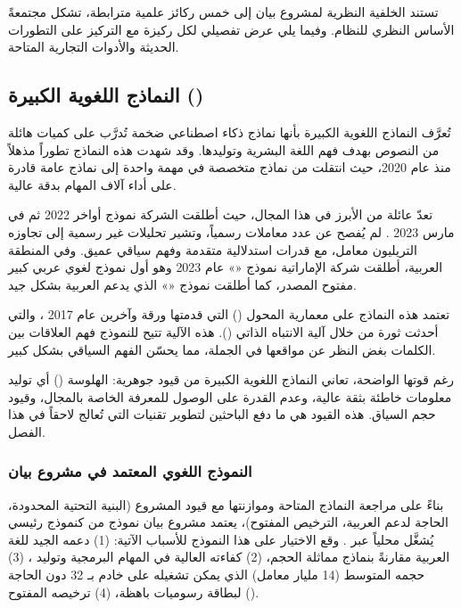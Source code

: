 تستند الخلفية النظرية لمشروع بيان إلى خمس ركائز علمية مترابطة، تشكل مجتمعةً
الأساس النظري للنظام. وفيما يلي عرض تفصيلي لكل ركيزة مع التركيز على التطورات
الحديثة والأدوات التجارية المتاحة.

\subsection{النماذج اللغوية الكبيرة ()}
\label{subsec:llms}

تُعرَّف النماذج اللغوية الكبيرة بأنها نماذج ذكاء اصطناعي ضخمة تُدرَّب على
كميات هائلة من النصوص بهدف فهم اللغة البشرية وتوليدها. وقد شهدت هذه النماذج
تطوراً مذهلاً منذ عام 2020، حيث انتقلت من نماذج متخصصة في مهمة واحدة إلى
نماذج عامة قادرة على أداء آلاف المهام بدقة عالية.

تعدّ عائلة  من  الأبرز في هذا المجال، حيث أطلقت الشركة
نموذج  أواخر 2022 ثم  في مارس 2023 \cite{openai2023gpt4}.
لم يُفصح  عن عدد معاملات  رسمياً، وتشير تحليلات غير
رسمية إلى تجاوزه التريليون معامل، مع قدرات استدلالية
متقدمة وفهم سياقي عميق. وفي المنطقة العربية، أطلقت شركة 
الإماراتية نموذج «» عام 2023 \cite{sengupta2023jais} وهو أول نموذج لغوي عربي كبير
مفتوح المصدر، كما
أطلقت  نموذج «» الذي يدعم العربية بشكل جيد.

تعتمد هذه النماذج على معمارية المحول () التي قدمتها ورقة
 وآخرين عام 2017 \cite{vaswani2017attention}، والتي أحدثت ثورة من
خلال آلية الانتباه الذاتي (). هذه الآلية تتيح للنموذج فهم
العلاقات بين الكلمات بغض النظر عن مواقعها في الجملة، مما يحسّن الفهم السياقي
بشكل كبير.

رغم قوتها الواضحة، تعاني النماذج اللغوية الكبيرة من قيود جوهرية: الهلوسة
() أي توليد معلومات خاطئة بثقة عالية، وعدم القدرة على
الوصول للمعرفة الخاصة بالمجال، وقيود حجم السياق. هذه القيود هي ما دفع
الباحثين لتطوير تقنيات  التي تُعالج لاحقاً في هذا الفصل.

\subsubsection{النموذج اللغوي المعتمد في مشروع بيان}
\label{subsubsec:chosen-llm}

بناءً على مراجعة النماذج المتاحة وموازنتها مع قيود المشروع (البنية التحتية
المحدودة، الحاجة لدعم العربية، الترخيص المفتوح)، يعتمد مشروع بيان نموذج
 من  كنموذج رئيسي يُشغَّل محلياً عبر
. وقع الاختيار على هذا النموذج للأسباب الآتية:
(1) دعمه الجيد للغة العربية مقارنةً بنماذج مماثلة الحجم،
(2) كفاءته العالية في المهام البرمجية وتوليد ،
(3) حجمه المتوسط (14 مليار معامل) الذي يمكن تشغيله على خادم بـ 32 
دون الحاجة لبطاقة رسوميات باهظة،
(4) ترخيصه المفتوح ().

